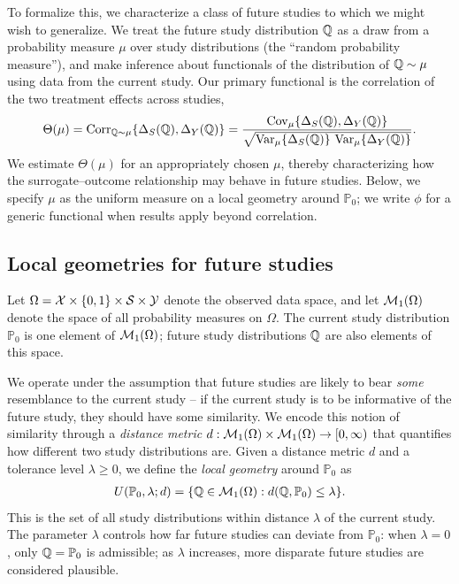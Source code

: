 \documentclass{article}
\newcommand{\PP}{\mathbb{P}}
\begin{document}
To formalize this, we characterize a class of future studies to which we might wish to generalize. We treat the future study distribution $\mathbb{Q}$ as a draw from a probability measure $\mu$ over study distributions (the ``random probability measure''), and make inference about functionals of the distribution of $\mathbb{Q} \sim \mu$ using data from the current study. Our primary functional is the correlation of the two treatment effects across studies,
\[
    \Theta(\mu) = \operatorname{Corr}_{\mathbb{Q} \sim \mu}\{\Delta_S(\mathbb{Q}), \Delta_Y(\mathbb{Q})\}
    = \frac{\operatorname{Cov}_{\mu}\{\Delta_S(\mathbb{Q}), \Delta_Y(\mathbb{Q})\}}{\sqrt{\operatorname{Var}_\mu\{\Delta_S(\mathbb{Q})\}\,\operatorname{Var}_\mu\{\Delta_Y(\mathbb{Q})\}}}.
\]
We estimate $\Theta(\mu)$ for an appropriately chosen $\mu$, thereby characterizing how the surrogate--outcome relationship may behave in future studies. Below, we specify $\mu$ as the uniform measure on a local geometry around $\PP_0$; we write $\phi$ for a generic functional when results apply beyond correlation.

\subsection{Local geometries for future studies}

Let $\Omega = \mathcal{X} \times \{0,1\} \times \mathcal{S} \times \mathcal{Y}$ denote the observed data space, and let $\mathcal{M}_1(\Omega)$ denote the space of all probability measures on $\Omega$. The current study distribution $\PP_0$ is one element of $\mathcal{M}_1(\Omega)$; future study distributions $\mathbb{Q}$ are also elements of this space.

We operate under the assumption that future studies are likely to bear \emph{some} resemblance to the current study -- if the current study is to be informative of the future study, they should have some similarity. We encode this notion of similarity through a \emph{distance metric} $d: \mathcal{M}_1(\Omega) \times \mathcal{M}_1(\Omega) \to [0,\infty)$ that quantifies how different two study distributions are. Given a distance metric $d$ and a tolerance level $\lambda \geq 0$, we define the \emph{local geometry} around $\PP_0$ as
\begin{align*}
    U(\PP_0, \lambda; d) = \{\Q \in \cM_1(\Omega) : d(\Q, \PP_0) \leq \lambda\}.
\end{align*}
This is the set of all study distributions within distance $\lambda$ of the current study. The parameter $\lambda$ controls how far future studies can deviate from $\PP_0$: when $\lambda = 0$, only $\Q = \PP_0$ is admissible; as $\lambda$ increases, more disparate future studies are considered plausible.
\end{document}
